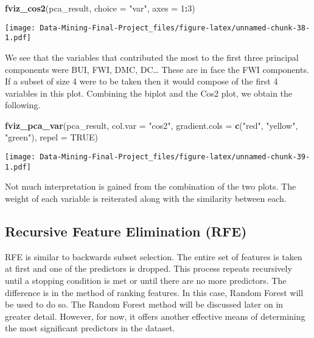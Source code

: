 \documentclass[
]{article}
\newenvironment{Shaded}{\begin{snugshade}}{\end{snugshade}}
\newcommand{\AttributeTok}[1]{\textcolor[rgb]{0.13,0.29,0.53}{#1}}
\newcommand{\ConstantTok}[1]{\textcolor[rgb]{0.56,0.35,0.01}{#1}}
\newcommand{\DecValTok}[1]{\textcolor[rgb]{0.00,0.00,0.81}{#1}}
\newcommand{\FunctionTok}[1]{\textcolor[rgb]{0.13,0.29,0.53}{\textbf{#1}}}
\newcommand{\NormalTok}[1]{#1}
\newcommand{\SpecialCharTok}[1]{\textcolor[rgb]{0.81,0.36,0.00}{\textbf{#1}}}
\newcommand{\StringTok}[1]{\textcolor[rgb]{0.31,0.60,0.02}{#1}}
\begin{document}
\begin{Shaded}
\begin{Highlighting}[]
\FunctionTok{fviz\_cos2}\NormalTok{(pca\_result, }\AttributeTok{choice =} \StringTok{"var"}\NormalTok{, }\AttributeTok{axes =} \DecValTok{1}\SpecialCharTok{:}\DecValTok{3}\NormalTok{)}
\end{Highlighting}
\end{Shaded}

\texttt{[image: Data-Mining-Final-Project\_files/figure-latex/unnamed-chunk-38-1.pdf]}

We see that the variables that contributed the most to the first three
principal components were BUI, FWI, DMC, DC\ldots{} These are in face
the FWI components. If a subset of size 4 were to be taken then it would
compose of the first 4 variables in this plot. Combining the biplot and
the Cos2 plot, we obtain the following.

\begin{Shaded}
\begin{Highlighting}[]
\FunctionTok{fviz\_pca\_var}\NormalTok{(pca\_result, }\AttributeTok{col.var =} \StringTok{"cos2"}\NormalTok{,}
            \AttributeTok{gradient.cols =} \FunctionTok{c}\NormalTok{(}\StringTok{"red"}\NormalTok{, }\StringTok{"yellow"}\NormalTok{, }\StringTok{"green"}\NormalTok{),}
            \AttributeTok{repel =} \ConstantTok{TRUE}\NormalTok{)}
\end{Highlighting}
\end{Shaded}

\texttt{[image: Data-Mining-Final-Project\_files/figure-latex/unnamed-chunk-39-1.pdf]}

Not much interpretation is gained from the combination of the two plots.
The weight of each variable is reiterated along with the similarity
between each.

\subsection{Recursive Feature Elimination
(RFE)}\label{recursive-feature-elimination-rfe}

RFE is similar to backwards subset selection. The entire set of features
is taken at first and one of the predictors is dropped. This process
repeats recursively until a stopping condition is met or until there are
no more predictors. The difference is in the method of ranking features.
In this case, Random Forest will be used to do so. The Random Forest
method will be discussed later on in greater detail. However, for now,
it offers another effective means of determining the most significant
predictors in the dataset.
\end{document}
